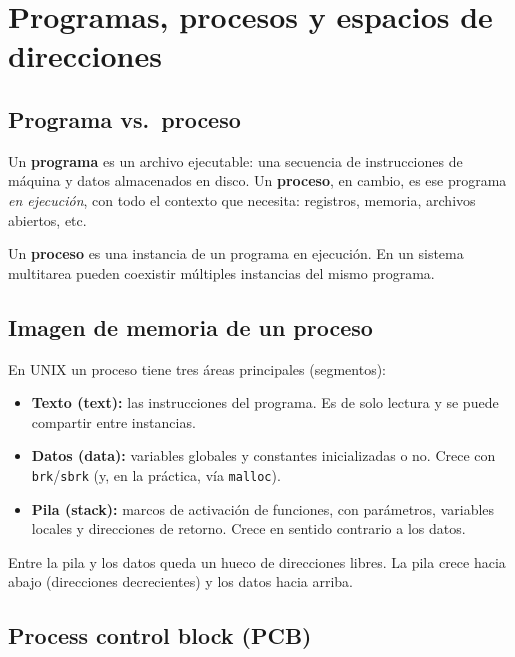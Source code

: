 \documentclass[11pt,a4paper]{article}
\begin{document}
\section{Programas, procesos y espacios de direcciones}

\subsection{Programa vs.\ proceso}

Un \textbf{programa} es un archivo ejecutable: una secuencia de
instrucciones de máquina y datos almacenados en disco. Un
\textbf{proceso}, en cambio, es ese programa \emph{en ejecución}, con
todo el contexto que necesita: registros, memoria, archivos abiertos,
etc.

\begin{definicion}
Un \textbf{proceso} es una instancia de un programa en ejecución. En un
sistema multitarea pueden coexistir múltiples instancias del mismo
programa.
\end{definicion}

\subsection{Imagen de memoria de un proceso}

En UNIX un proceso tiene tres áreas principales (segmentos):

\begin{itemize}[leftmargin=*]
    \item \textbf{Texto (text):} las instrucciones del programa. Es de
        solo lectura y se puede compartir entre instancias.
    \item \textbf{Datos (data):} variables globales y constantes
        inicializadas o no. Crece con \texttt{brk}/\texttt{sbrk} (y, en
        la práctica, vía \texttt{malloc}).
    \item \textbf{Pila (stack):} marcos de activación de funciones, con
        parámetros, variables locales y direcciones de retorno. Crece
        en sentido contrario a los datos.
\end{itemize}

Entre la pila y los datos queda un hueco de direcciones libres. La pila
crece hacia abajo (direcciones decrecientes) y los datos hacia arriba.

\subsection{Process control block (PCB)}
\end{document}
